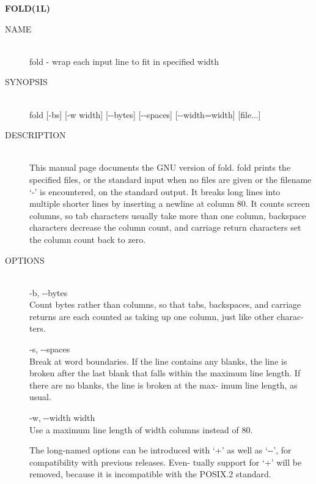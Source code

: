 
\begin{center} {\bf
FOLD(1L)
} \end{center}
\begin{description}


\item[NAME] \hfill \\
       fold - wrap each input line to fit in specified width

\item[SYNOPSIS] \hfill \\
       fold [-bs] [-w width] [-\hspace{.01cm}-bytes] [-\hspace{.01cm}-spaces] [-\hspace{.01cm}-width=width]
       [file...]

\item[DESCRIPTION] \hfill \\
       This manual page documents the GNU version of fold.   fold
       prints  the specified files, or the standard input when no
       files are given or the filename `-' is encountered, on the
       standard  output.   It  breaks  long  lines  into multiple
       shorter lines by inserting a newline  at  column  80.   It
       counts screen columns, so tab characters usually take more
       than one column, backspace characters decrease the  column
       count, and carriage return characters set the column count
       back to zero.

\item[OPTIONS] \hfill \\
       -b, -\hspace{.01cm}-bytes \\
              Count bytes rather  than  columns,  so  that  tabs,
              backspaces,  and  carriage returns are each counted
              as taking up one column, just  like  other  charac-
              ters.

       -s, -\hspace{.01cm}-spaces \\
              Break at word boundaries.  If the line contains any
              blanks, the line is broken  after  the  last  blank
              that  falls  within  the  maximum  line length.  If
              there are no blanks, the line is broken at the max-
              imum line length, as usual.

       -w, -\hspace{.01cm}-width width \\
              Use  a maximum line length of width columns instead
              of 80.

       The long-named options can be introduced with `+' as  well
       as  `-\hspace{.01cm}-', for compatibility with previous releases.  Even-
       tually support for `+' will  be  removed,  because  it  is
       incompatible with the POSIX.2 standard.
\end{description}
 
